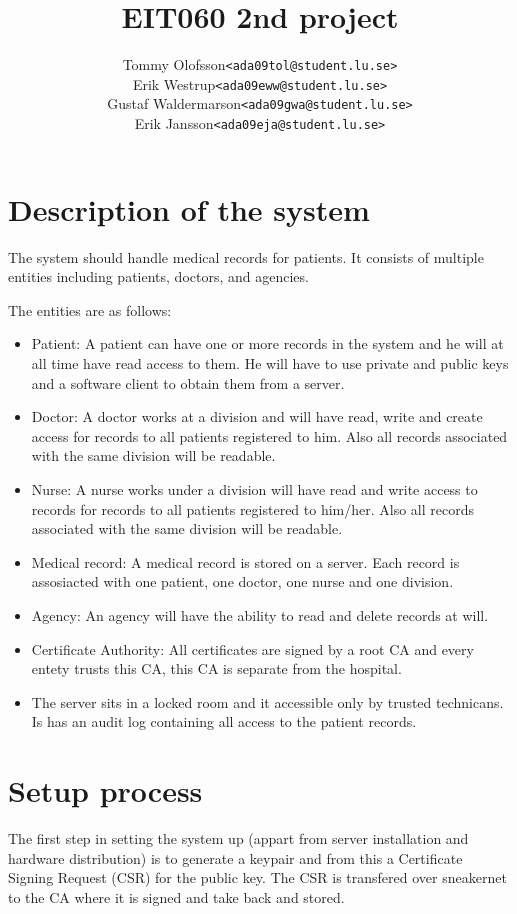 \documentclass[10pt, a4paper]{article}
\title{EIT060 2nd project}
\date{}
\author{
\begin{tabular}{l l}
Tommy Olofsson & \texttt{<ada09tol@student.lu.se>}\\
Erik Westrup & \texttt{<ada09eww@student.lu.se>}\\
Gustaf Waldermarson & \texttt{<ada09gwa@student.lu.se>}\\
Erik Jansson & \texttt{<ada09eja@student.lu.se>}
\end{tabular}
}
\begin{document}
\begin{titlepage}
\maketitle
\begin{center}
\end{center}

\thispagestyle{empty}
\end{titlepage}
\setcounter{page}{2}
\section{Description of the system}
The system should handle medical records for patients. It consists of multiple entities including patients, doctors, and agencies. %

The entities are as follows:
\begin{itemize}
\item Patient: A patient can have one or more records in the system and he will at all time have read access to them. He will have to use private and public keys and a software client to obtain them from a server. 
\item Doctor: A doctor works at a division and will have read, write and create access for records to all patients registered to him. Also all records associated with the same division will be readable.
\item Nurse: A nurse works under a division will have read and write access to records for records to all patients registered to him/her. Also all records associated with the same division will be readable.
\item Medical record: A medical record is stored on a server. Each record is assosiacted with one patient, one doctor, one nurse and one division.
\item Agency: An agency will have the ability to read and delete records at will.
\item Certificate Authority: All certificates are signed by a root CA and every entety trusts this CA, this CA is
separate from the hospital.
\item The server sits in a locked room and it accessible only by trusted technicans. Is has an audit log containing all access to the patient records.
\end{itemize}

\section{Setup process}
The first step in setting the system up (appart from server installation and hardware distribution) is to generate a keypair and from this a Certificate Signing Request (CSR) for the public key. The CSR is transfered over sneakernet to the CA where it is signed and take back and stored. 
\end{document}

